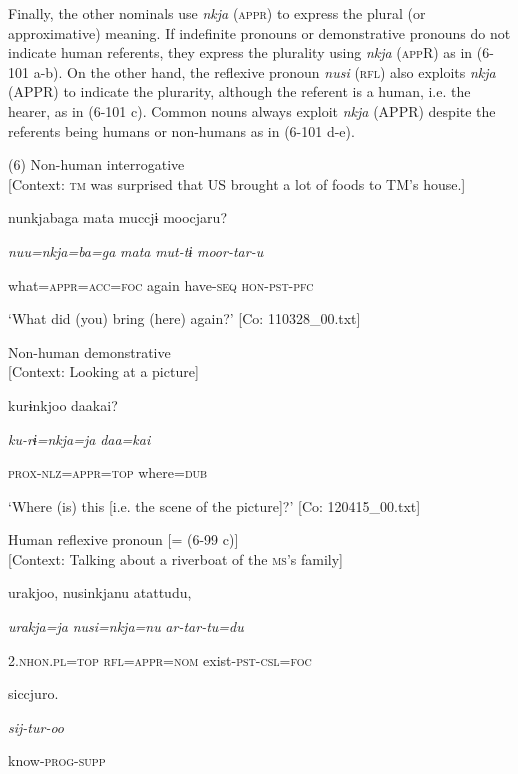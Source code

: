   Finally, the other nominals use \textit{nkja} (\textsc{appr}) to express the plural (or approximative) meaning. If indefinite pronouns or demonstrative pronouns do not indicate human referents, they express the plurality using \textit{nkja} (\textsc{app}R) as in (6-101 a-b). On the other hand, the reflexive pronoun \textit{nusi} (\textsc{rfl}) also exploits \textit{nkja} (APPR) to indicate the plurarity, although the referent is a human, i.e. the hearer, as in (6-101 c). Common nouns always exploit \textit{nkja} (APPR) despite the referents being humans or non-humans as in (6-101 d-e).

(6) \ea Non-human interrogative\\{}
[Context: \textsc{tm} was surprised that US brought a lot of foods to TM’s house.]

{\TM}
\gll nunkjabaga  mata  muccjɨ  moocjaru?

      \textit{nuu=nkja=ba=ga}  \textit{mata}  \textit{mut-tɨ}  \textit{moor-tar-u}

      what=\textsc{appr}=\textsc{acc}=\textsc{foc}  again  have-\textsc{seq}  \textsc{hon}-\textsc{pst}-\textsc{pfc}

\glt ‘What did (you) bring (here) again?’ [Co: 110328\_00.txt]
\z

 \ex Non-human demonstrative\\{}
[Context: Looking at a picture]

{\TM}
\gll kurɨnkjoo  daakai?

      \textit{ku-rɨ=nkja=ja}  \textit{daa=kai}

      \textsc{prox}-\textsc{nlz}=\textsc{appr}=\textsc{top}  where=\textsc{dub}

\glt ‘Where (is) this [i.e. the scene of the picture]?’ [Co: 120415\_00.txt]
\z

 \ex Human reflexive pronoun [= (6-99 c)]\\{}
[Context: Talking about a riverboat of the \textsc{ms}’s family]

{\TM}
\gll urakjoo,  nusinkjanu  atattudu,

      \textit{urakja=ja}  \textit{nusi=nkja=nu}  \textit{ar-tar-tu=du}

      2.\textsc{nhon}.\textsc{pl}=\textsc{top}  \textsc{rfl}=\textsc{appr}=\textsc{nom}  exist-\textsc{pst}-\textsc{csl}=\textsc{foc}

      siccjuro.

      \textit{sij-tur-oo}

      know-\textsc{prog}-\textsc{supp}

